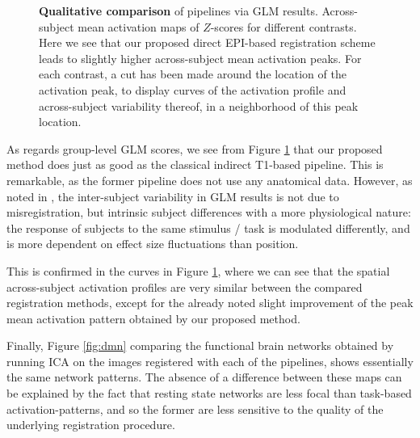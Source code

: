 \begin{figure}[!htbp]
\caption{\textbf{Qualitative comparison} of pipelines via GLM results.
  Across-subject mean activation maps of $Z$-scores for different contrasts.
  Here we see that our proposed direct EPI-based registration scheme leads to slightly higher across-subject mean activation peaks.  For each contrast, a cut has been made around the location of the activation peak, to display curves of the activation profile and across-subject variability thereof, in a neighborhood of this peak location.
}
\label{fig:zmaps}
\end{figure}

As regards group-level GLM scores, we see from Figure \ref{fig:zmaps}
that our proposed method does just as good as the classical indirect
T1-based pipeline. This is remarkable, as the former pipeline does not
use any anatomical data.
However, as noted in \citep{thirion2007analysis,pmid22425669}, the
inter-subject variability in GLM results is not due to
misregistration, but intrinsic subject differences with a more
physiological nature: the response of subjects to the same stimulus /
task is modulated differently, and is more dependent on effect size fluctuations than position. 

%
This
is confirmed in the curves in Figure \ref{fig:zmaps}, where we can see that the spatial across-subject activation profiles
are very similar between the compared registration methods, except for the already noted
slight improvement of the peak mean activation pattern obtained by our proposed method.

Finally, Figure \ref{fig:dmn} comparing the functional brain networks obtained by running
ICA on the images registered with each of the pipelines, shows essentially the same network
patterns. The absence of a difference between these maps can be explained by the fact that
resting state networks are less focal than task-based activation-patterns, and
so the former are less sensitive to the quality of the underlying registration procedure.

